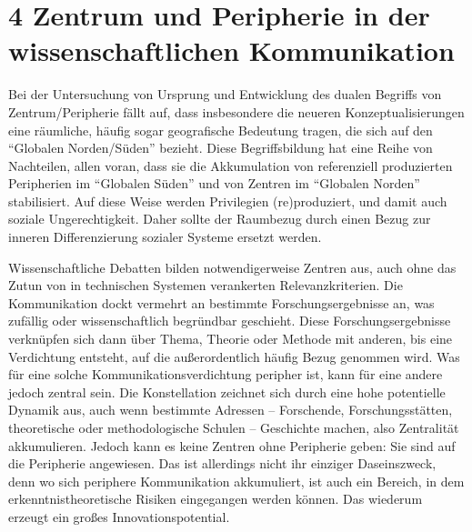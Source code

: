 \documentclass[a4paper,
fontsize=11pt,
oneside,
numbers=noperiodatend,
parskip=half-,
bibliography=totoc,
final
]{scrartcl}
\begin{document}
\hypertarget{peripherie}{%
\section{4 Zentrum und Peripherie in der wissenschaftlichen
Kommunikation}\label{peripherie}}

Bei der Untersuchung von Ursprung und Entwicklung des dualen Begriffs
von Zentrum/Peripherie fällt auf, dass insbesondere die neueren
Konzeptualisierungen eine räumliche, häufig sogar geografische Bedeutung
tragen, die sich auf den \enquote{Globalen Norden/Süden} bezieht. Diese
Begriffsbildung hat eine Reihe von Nachteilen, allen voran, dass sie die
Akkumulation von referenziell produzierten Peripherien im
\enquote{Globalen Süden} und von Zentren im \enquote{Globalen Norden}
stabilisiert. Auf diese Weise werden Privilegien (re)produziert, und
damit auch soziale Ungerechtigkeit. Daher sollte der Raumbezug durch
einen Bezug zur inneren Differenzierung sozialer Systeme ersetzt werden.

Wissenschaftliche Debatten bilden notwendigerweise Zentren aus, auch
ohne das Zutun von in technischen Systemen verankerten
Relevanzkriterien. Die Kommunikation dockt vermehrt an bestimmte
Forschungsergebnisse an, was zufällig oder wissenschaftlich begründbar
geschieht. Diese Forschungsergebnisse verknüpfen sich dann über Thema,
Theorie oder Methode mit anderen, bis eine Verdichtung entsteht, auf die
außerordentlich häufig Bezug genommen wird. Was für eine solche
Kommunikationsverdichtung peripher ist, kann für eine andere jedoch
zentral sein. Die Konstellation zeichnet sich durch eine hohe
potentielle Dynamik aus, auch wenn bestimmte Adressen -- Forschende,
Forschungsstätten, theoretische oder methodologische Schulen --
Geschichte machen, also Zentralität akkumulieren. Jedoch kann es keine
Zentren ohne Peripherie geben: Sie sind auf die Peripherie angewiesen.
Das ist allerdings nicht ihr einziger Daseinszweck, denn wo sich
periphere Kommunikation akkumuliert, ist auch ein Bereich, in dem
erkenntnistheoretische Risiken eingegangen werden können. Das wiederum
erzeugt ein großes Innovationspotential.
\end{document}
